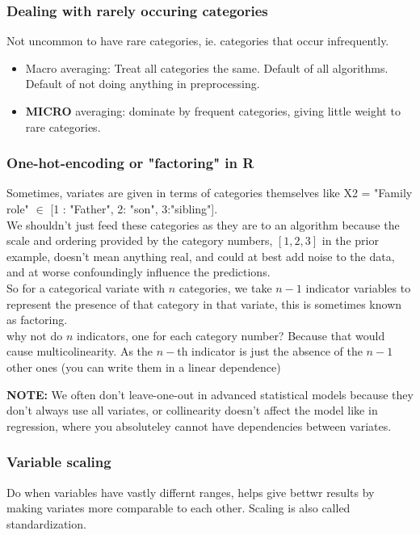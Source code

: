 \documentclass{article}
\begin{document}
\subsubsection{Dealing with rarely occuring categories}
Not uncommon to have rare categories, ie. categories that occur infrequently.
\begin{itemize}
\item Macro averaging: Treat all categories the same. Default of all algorithms. Default of not doing anything in preprocessing.
\item \textbf{MICRO} averaging: dominate by frequent categories, giving little weight to rare categories.
\end{itemize}


\subsubsection{One-hot-encoding or "factoring" in R}
Sometimes, variates are given in terms of categories themselves like X2 = "Family role" $\in$ [1 : "Father", 2: "son", 3:"sibling"]. \\

We shouldn't just feed these categories as they are to an algorithm because the scale and ordering provided by the category numbers, $[1,2,3]$ in the prior example, doesn't mean anything real, and could at best add noise to the data, and at worse confoundingly influence the predictions.\\ 

So for a categorical variate with $n$ categories, we take $n-1$ indicator variables to represent the presence of that category in that variate, this is sometimes known as factoring. \\

why not do $n$ indicators, one for each category number? Because that would cause multicolinearity. As the $n-$th indicator is just the absence of the $n-1$ other ones (you can write them in a linear dependence)

\textbf{NOTE:} We often don't leave-one-out in advanced statistical models because they don't always use all variates, or collinearity doesn't affect the model like in regression, where you absoluteley cannot have dependencies between variates.


\subsubsection{Variable scaling}
Do when variables have vastly differnt ranges, helps give bettwr results by making variates more comparable to each other. 
Scaling is also called standardization.
\end{document}
